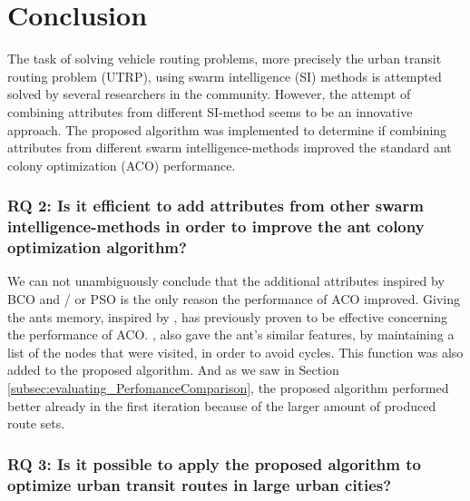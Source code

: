 \section{Conclusion}



The task of solving vehicle routing problems, more precisely the urban transit routing problem (UTRP), using swarm intelligence (SI) methods is attempted solved by several researchers in the community. However, the attempt of combining attributes from different SI-method seems to be an innovative approach. The proposed algorithm was implemented to determine if combining attributes from different swarm intelligence-methods improved the standard ant colony optimization (ACO) performance. %


\subsubsection*{RQ 2: Is it efficient to add attributes from other swarm intelligence-methods in order to improve the ant colony optimization algorithm?}

We can not unambiguously conclude that the additional attributes inspired by BCO and / or PSO is the only reason the performance of ACO improved. Giving the ants memory, inspired by \citet{dorigo96}, has previously proven to be effective concerning the performance of ACO. \citet{sedighpour14}, \citet{poorzahedy11} \citet{salehinejad10} also gave the ant's similar features, by maintaining a list of the nodes that were visited, in order to avoid cycles. This function was also added to the proposed algorithm. And as we saw in Section \vref{subsec:evaluating_PerfomanceComparison}, the proposed algorithm performed better already in the first iteration because of the larger amount of produced route sets.

\subsubsection*{RQ 3: Is it possible to apply the proposed algorithm to optimize urban transit routes in large urban cities?}



